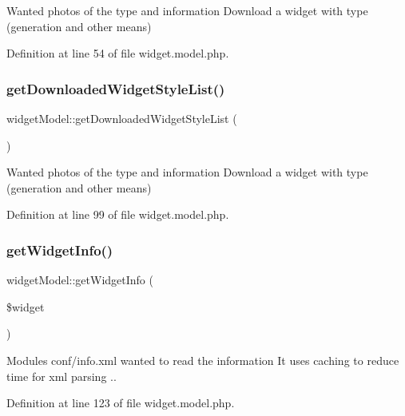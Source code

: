 Wanted photos of the type and information Download a widget with type (generation and other means) 



Definition at line 54 of file widget.\+model.\+php.

\mbox{\label{classwidgetModel_a417d153dcef8dd22eddd204fa0fde16f}} 
\subsubsection{\texorpdfstring{get\+Downloaded\+Widget\+Style\+List()}{getDownloadedWidgetStyleList()}}
{\footnotesize\ttfamily widget\+Model\+::get\+Downloaded\+Widget\+Style\+List (\begin{DoxyParamCaption}{ }\end{DoxyParamCaption})}



Wanted photos of the type and information Download a widget with type (generation and other means) 



Definition at line 99 of file widget.\+model.\+php.

\mbox{\label{classwidgetModel_a6e29e4176b458525680606cb376cbff1}} 
\subsubsection{\texorpdfstring{get\+Widget\+Info()}{getWidgetInfo()}}
{\footnotesize\ttfamily widget\+Model\+::get\+Widget\+Info (\begin{DoxyParamCaption}\item[{}]{\$widget }\end{DoxyParamCaption})}



Modules conf/info.\+xml wanted to read the information It uses caching to reduce time for xml parsing .. 



Definition at line 123 of file widget.\+model.\+php.

\mbox{\label{classwidgetModel_a4d8d9f9e650ece12a4cfa4338d1a9cc5}} 
